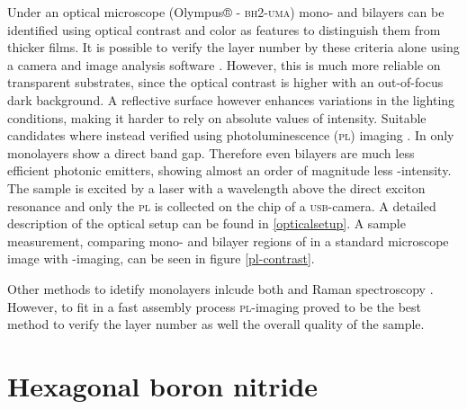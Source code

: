 Under an optical microscope (Olympus® - \textsc{bh}2-\textsc{uma}) mono- and bilayers can be identified using optical contrast and color as features to distinguish them from thicker films. It is possible to verify the layer number by these criteria alone using a camera and image analysis software \cite{funk_spectroscopy_2017}. However, this is much more reliable on transparent substrates, since the optical contrast is higher with an out-of-focus dark background. A reflective surface however enhances variations in the lighting conditions, making it harder to rely on absolute values of intensity. Suitable candidates where instead verified using photoluminescence (\textsc{pl}) imaging \cite{neumann_opto-valleytronic_2017}. In \tmds only monolayers show a direct band gap. Therefore even bilayers are much less efficient photonic emitters, showing almost an order of magnitude less \pl-intensity. The sample is excited by a laser with a wavelength above the direct exciton resonance and only the \textsc{pl} is collected on the chip of a \textsc{usb}-camera. A detailed description of the optical setup can be found in \ref{opticalsetup}. A sample measurement, comparing mono- and bilayer regions of \wse in a standard microscope image with \pl-imaging, can be seen in figure \ref{pl-contrast}. 

Other methods to idetify monolayers inlcude both \pl and Raman spectroscopy \cite{zhao_lattice_2013,zhang_phonon_2015,tonndorf_photoluminescence_2013}. However, to fit in a fast assembly process \textsc{pl}-imaging proved to be the best method to verify the layer number as well the overall quality of the sample.

\section{Hexagonal boron nitride}

